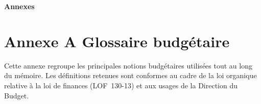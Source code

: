 \newpage
{}
{}

\begin{center}
{\Huge\bfseries Annexes}
\end{center}

\vspace{1cm}

\section*{Annexe A \quad Glossaire budg\'etaire}

Cette annexe regroupe les principales notions budg\'etaires utilis\'ees
tout au long du m\'emoire. Les d\'efinitions retenues sont conformes au
cadre de la loi organique relative \`a la loi de finances (LOF~130-13)
et aux usages de la Direction du Budget.

